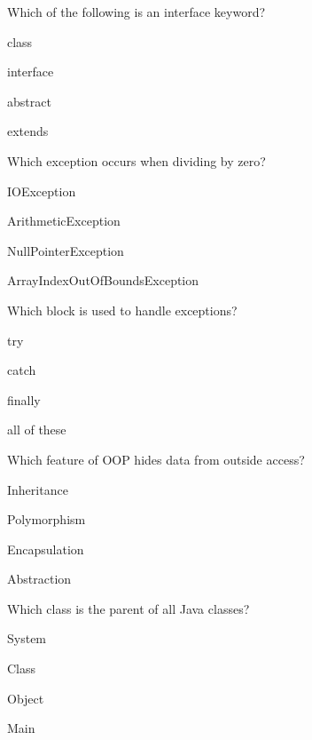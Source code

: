 \documentclass{USTBExam}
\begin{document}
\begin{question}
Which of the following is an interface keyword?
\paren
\begin{choices}
\item class
\item interface
\item abstract
\item extends
\end{choices}
\end{question}

\begin{question}
Which exception occurs when dividing by zero?
\paren
\begin{choices}
\item IOException
\item ArithmeticException
\item NullPointerException
\item ArrayIndexOutOfBoundsException
\end{choices}
\end{question}

\begin{question}
Which block is used to handle exceptions?
\paren
\begin{choices}
\item try
\item catch
\item finally
\item all of these
\end{choices}
\end{question}

\begin{question}
Which feature of OOP hides data from outside access?
\paren
\begin{choices}
\item Inheritance
\item Polymorphism
\item Encapsulation
\item Abstraction
\end{choices}
\end{question}

\begin{question}
Which class is the parent of all Java classes?
\paren
\begin{choices}
\item System
\item Class
\item Object
\item Main
\end{choices}
\end{question}
\end{document}
